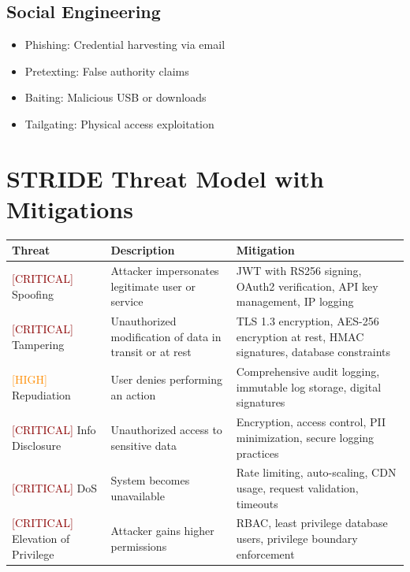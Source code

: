 \documentclass{report}
\begin{document}
\subsection{Social Engineering}
\begin{itemize}
\item Phishing: Credential harvesting via email
\item Pretexting: False authority claims
\item Baiting: Malicious USB or downloads
\item Tailgating: Physical access exploitation
\end{itemize}

\section{STRIDE Threat Model with Mitigations}

\begin{table}[h]
\centering
\small
\begin{tabular}{|p{1.5cm}|p{3.5cm}|p{4cm}|}
\hline
\textbf{Threat} & \textbf{Description} & \textbf{Mitigation} \\
\hline
\textcolor{darkred}{[CRITICAL]} Spoofing & Attacker impersonates legitimate user or service & JWT with RS256 signing, OAuth2 verification, API key management, IP logging \\
\hline
\textcolor{darkred}{[CRITICAL]} Tampering & Unauthorized modification of data in transit or at rest & TLS 1.3 encryption, AES-256 encryption at rest, HMAC signatures, database constraints \\
\hline
\textcolor{darkorange}{[HIGH]} Repudiation & User denies performing an action & Comprehensive audit logging, immutable log storage, digital signatures \\
\hline
\textcolor{darkred}{[CRITICAL]} Info Disclosure & Unauthorized access to sensitive data & Encryption, access control, PII minimization, secure logging practices \\
\hline
\textcolor{darkred}{[CRITICAL]} DoS & System becomes unavailable & Rate limiting, auto-scaling, CDN usage, request validation, timeouts \\
\hline
\textcolor{darkred}{[CRITICAL]} Elevation of Privilege & Attacker gains higher permissions & RBAC, least privilege database users, privilege boundary enforcement \\
\hline
\end{tabular}
\end{table}
\end{document}
